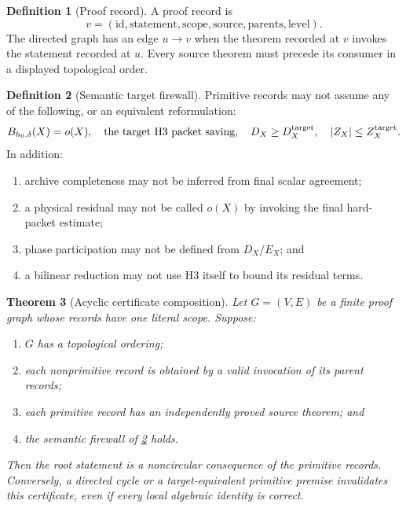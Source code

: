 \documentclass[11pt]{article}
\newtheorem{theorem}{Theorem}[section]
\theoremstyle{definition}
\newtheorem{definition}[theorem]{Definition}
\theoremstyle{remark}
\begin{document}
\begin{definition}[Proof record]
\label{def:proofrecord}
A proof record is
\[
 v=(\mathrm{id},\mathrm{statement},\mathrm{scope},
    \mathrm{source},\mathrm{parents},\mathrm{level}).
\]
The directed graph has an edge \(u\to v\) when the theorem recorded at
\(v\) invokes the statement recorded at \(u\).  Every source theorem
must precede its consumer in a displayed topological order.
\end{definition}

\begin{definition}[Semantic target firewall]
\label{def:firewall}
Primitive records may not assume any of the following, or an
equivalent reformulation:
\[
 B_{h_0,\delta}(X)=o(X),\quad
 \text{the target H3 packet saving},\quad
 D_X\ge D_X^{\rm target},\quad
 |Z_X|\le Z_X^{\rm target}.
\]
In addition:
\begin{enumerate}[label=(\roman*),leftmargin=2em]
\item archive completeness may not be inferred from final scalar
  agreement;
\item a physical residual may not be called \(o(X)\) by invoking the
  final hard-packet estimate;
\item phase participation may not be defined from \(D_X/E_X\); and
\item a bilinear reduction may not use H3 itself to bound its
  residual terms.
\end{enumerate}
\end{definition}

\begin{theorem}[Acyclic certificate composition]
\label{thm:dag}
Let \(G=(V,E)\) be a finite proof graph whose records have one literal
scope.  Suppose:
\begin{enumerate}[label=(\alph*),leftmargin=2em]
\item \(G\) has a topological ordering;
\item each nonprimitive record is obtained by a valid invocation of
  its parent records;
\item each primitive record has an independently proved source
  theorem; and
\item the semantic firewall of \cref{def:firewall} holds.
\end{enumerate}
Then the root statement is a noncircular consequence of the primitive
records.  Conversely, a directed cycle or a target-equivalent
primitive premise invalidates this certificate, even if every local
algebraic identity is correct.
\end{theorem}
\end{document}
